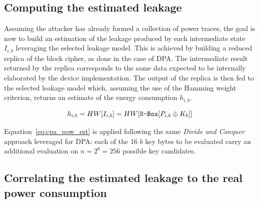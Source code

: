         \subsection{Computing the estimated leakage}
            Assuming the attacker has already formed a collection of power traces, the goal is now to build an estimation of the leakage produced by each intermediate state $I_{i,b}$ leveraging the selected leakage model. This is achieved by building a reduced replica of the block cipher, as done in the case of DPA. The intermediate result returned by the replica corresponds to the same data expected to be internally elaborated by the device implementation. The output of the replica is then fed to the selected leakage model which, assuming the use of the Hamming weight criterion, returns an estimate of the energy consumption $h_{i,b}$.

            \begin{equation}\label{eq:cpa_pow_est}
                h_{i,b} = HW[I_{i,b}] = HW[\texttt{S-Box}{}[P_{i,b} \oplus K_b]]
            \end{equation}

            Equation~\ref{eq:cpa_pow_est} is applied following the same \emph{Divide and Conquer} approach leveraged for DPA: each of the 16 $b$ key bytes to be evaluated carry an additional evaluation on $n = 2^8 = 256$ possible key candidates.

        \subsection{Correlating the estimated leakage to the real power consumption}
            

            
            
            
            

